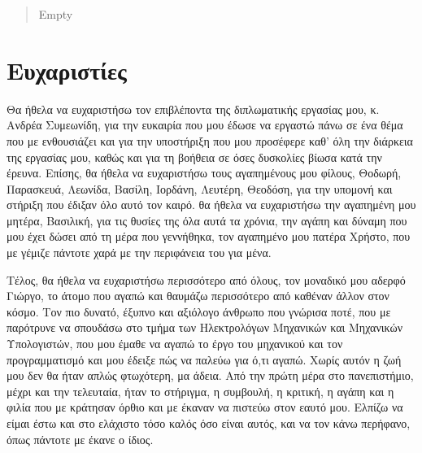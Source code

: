 \begin{abstract}
  Empty
\end{abstract}

\thispagestyle{empty}


\section*{Ευχαριστίες} \thispagestyle{empty}

Θα ήθελα να ευχαριστήσω τον επιβλέποντα της διπλωματικής εργασίας μου,
κ. Ανδρέα Συμεωνίδη, για την ευκαιρία που μου έδωσε να εργαστώ πάνω σε
ένα θέμα που με ενθουσιάζει και για την υποστήριξη που μου προσέφερε
καθ' όλη την διάρκεια της εργασίας μου, καθώς και για τη βοήθεια σε όσες
δυσκολίες βίωσα κατά την έρευνα. Επίσης, θα ήθελα να ευχαριστήσω τους
αγαπημένους μου φίλους, Θοδωρή, Παρασκευά, Λεωνίδα, Βασίλη, Ιορδάνη,
Λευτέρη, Θεοδόση, για την υπομονή και στήριξη που έδιξαν όλο αυτό τον
καιρό. θα ήθελα να ευχαριστήσω την αγαπημένη μου μητέρα, Βασιλική, για
τις θυσίες της όλα αυτά τα χρόνια, την αγάπη και δύναμη που μου έχει
δώσει από τη μέρα που γεννήθηκα, τον αγαπημένο μου πατέρα Χρήστο, που με
γέμιζε πάντοτε χαρά με την περιφάνεια του για μένα.

Τέλος, θα ήθελα να ευχαριστήσω περισσότερο από όλους, τον μοναδικό μου
αδερφό Γιώργο, το άτομο που αγαπώ και θαυμάζω περισσότερο από καθέναν
άλλον στον κόσμο. Τον πιο δυνατό, έξυπνο και αξιόλογο άνθρωπο που
γνώρισα ποτέ, που με παρότρυνε να σπουδάσω στο τμήμα των Ηλεκτρολόγων
Μηχανικών και Μηχανικών Υπολογιστών, που μου έμαθε να αγαπώ το έργο του
μηχανικού και τον προγραμματισμό και μου έδειξε πώς να παλεύω για ό,τι
αγαπώ. Χωρίς αυτόν η ζωή μου δεν θα ήταν απλώς φτωχότερη, μα άδεια. Από
την πρώτη μέρα στο πανεπιστήμιο, μέχρι και την τελευταία, ήταν το
στήριγμα, η συμβουλή, η κριτική, η αγάπη και η φιλία που με κράτησαν
όρθιο και με έκαναν να πιστεύω στον εαυτό μου. Ελπίζω να είμαι έστω και
στο ελάχιστο τόσο καλός όσο είναι αυτός, και να τον κάνω περήφανο, όπως
πάντοτε με έκανε ο ίδιος.
